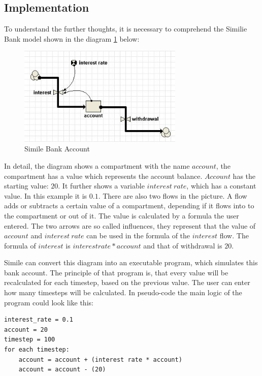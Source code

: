\subsection{Implementation}
\par
To understand the further thoughts, it is necessary to comprehend the Similie Bank model shown in the diagram \ref{fig:simile_bank_account} below:
\begin{figure}[h]
	\centering
	\includegraphics[width=0.7\textwidth]{pics/generation_of_a_dsl/similie_bank_account.png}
	\caption{Simile Bank Account \label{fig:simile_bank_account}}	
\end{figure}
\par
In detail, the diagram shows a compartment with the name $account$, the compartment has a value which represents the account balance. $Account$ has the starting value: $20$. It further shows a variable $interest\:rate$, which has a constant value. In this example it is $0.1$. There are also two flows in the picture. A flow adds or subtracts a certain value of a compartment, depending if it flows into to the compartment or out of it. The value is calculated by a formula the user entered. The two arrows are so called influences, they represent that the value of $account$ and $interest\:rate$ can be used in the formula of the $interest$ flow. The formula of $interest$ is $interest rate * account$ and that of withdrawal is $20$.
\par
Simile can convert this diagram into an executable program, which simulates this bank account. The principle of that program is, that every value will be recalculated for each timestep, based on the previous value. The user can enter how many timesteps will be calculated. In pseudo-code the main logic of the program could look like this:
\begin{verbatim}
interest_rate = 0.1
account = 20
timestep = 100
for each timestep:
	account = account + (interest rate * account)
	account = account - (20)
\end{verbatim}
